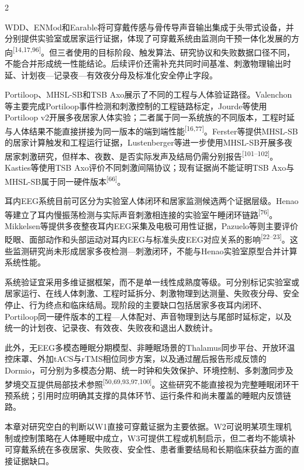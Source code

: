 \documentclass[UTF8,zihao=5,fontset=none]{ctexart}
\newcommand{\hei}{\CJKfamily{hei}}
\newcommand{\levelone}[1]{%
  \par\noindent{\hei\fontsize{12pt}{15.6pt}\selectfont\bfseries #1\par}}
\newcommand{\refcite}[1]{\nolinebreak[4]\textsuperscript{[#1]}}
\begin{document}
\begin{multicols}{2}

WDD、ENMod和Earable将可穿戴传感与骨传导声音输出集成于头带式设备，并分别提供实验室或居家运行证据，体现了可穿戴系统由监测向干预一体化发展的方向\refcite{14,17,96}。但三者使用的目标阶段、触发算法、研究协议和失败数据口径不同，不能合并形成统一性能结论。后续评价还需补充共同时间基准、刺激物理输出时延、计划夜—记录夜—有效夜分母及标准化安全停止字段。\par

Portiloop、MHSL-SB和TSB Axo展示了不同的工程与人体验证路径。Valenchon等主要完成Portiloop事件检测和刺激控制的工程链路标定，Jourde等使用Portiloop v2开展多夜居家人体实验；二者属于同一系统族的不同版本，工程时延与人体结果不能直接拼接为同一版本的端到端性能\refcite{16,77}。Ferster等提供MHSL-SB的居家计算触发和工程运行证据，Lustenberger等进一步使用MHSL-SB开展多夜居家刺激研究，但样本、夜数、是否实际发声及结局仍需分别报告\refcite{101--102}。Kasties等使用TSB Axo评价不同刺激间隔协议；现有证据尚不能证明TSB Axo与MHSL-SB属于同一硬件版本\refcite{66}。\par

耳内EEG系统目前可区分为实验室人体闭环和居家监测候选两个证据层级。Henao等建立了耳内慢振荡检测与实际声音刺激相连接的实验室午睡闭环链路\refcite{76}。Mikkelsen等提供多夜整夜耳内EEG采集及电极可用性证据，Pazuelo等则主要评价眨眼、面部动作和头部运动对耳内EEG与标准头皮EEG对应关系的影响\refcite{22--23}。这些监测研究尚未形成居家多夜检测—刺激闭环，不能与Henao实验室原型合并计算系统性能。\par

系统验证宜采用多维证据框架，而不是单一线性成熟度等级。可分别标记实验室或居家运行、在线人体刺激、工程时延拆分、刺激物理到达测量、失败夜分母、安全停止、行为终点和临床结局。现阶段的主要缺口包括居家多夜耳内闭环、Portiloop同一硬件版本的工程—人体配对、声音物理到达与尾部时延标定，以及统一的计划夜、记录夜、有效夜、失败夜和退出人数统计。\par

此外，无EEG多模态睡眠分期模型、非睡眠场景的Thalamus同步平台、开放环温控床罩、外加tACS与rTMS相位同步方案，以及通过醒后报告形成反馈的Dormio，可分别为多模态分期、统一时钟和失效保护、环境控制、多刺激同步及梦境交互提供局部技术参照\refcite{50,69,93,97,100}。这些研究不能直接视为完整睡眠闭环干预系统；引用时应明确其支撑的具体环节、运行条件和尚未覆盖的睡眠内反馈链路。\par

\levelone{6 关键挑战与展望}

本章对研究空白的判断以W1直接可穿戴证据为主要依据。W2可说明某项生理机制或控制策略在人体睡眠中成立，W3可提供工程或机制启示，但二者均不能填补可穿戴系统在多夜居家、失败夜、安全性、患者重要结局和长期临床获益方面的直接证据缺口。\par


\end{multicols}
\end{document}
